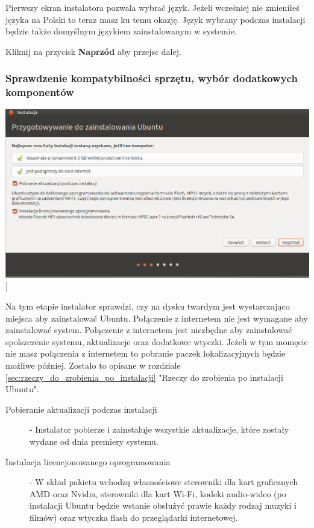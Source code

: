Pierwszy ekran instalatora pozwala wybrać język. Jeżeli wcześniej nie zmieniłeś języka na Polski to teraz masz ku temu okazję. Język wybrany podczas instalacji będzie także domyślnym językiem zainstalowanym w systemie.

\begin{flushright}
Kliknij na przycisk \textbf{Naprzód} aby przejsc dalej.
\end{flushright}
\clearpage

\subsubsection{Sprawdzenie kompatybilności sprzętu, wybór dodatkowych komponentów}
\begin{center}
	\includegraphics[scale=0.5]{images/instalator_wymagania.png}]
\end{center}

Na tym etapie instalator sprawdzi, czy na dysku twardym jest wystarczająco miejsca aby zainstalować Ubuntu. Połączenie z internetem nie jest wymagane aby zainstalować system. Połączenie z internetem jest niezbędne aby zainstalować spolszczenie systemu, aktualizacje oraz dodatkowe wtyczki. Jeżeli w tym momęcie nie masz połączenia z internetem to pobranie paczek lokalizacyjnych będzie możliwe później. Zostało to opisane w rozdziale \ref{sec:rzeczy_do_zrobienia_po_instalacji} "Rzeczy do zrobienia po instalacji Ubuntu".

\begin{description}
\item[Pobieranie aktualizacji podczas instalacji] - Instalator pobierze i zainstaluje wszystkie aktualizacje, które zostały wydane od dnia premiery systemu.
\item[Instalacja licencjonowanego oprogramowania] - W skład pakietu wchodzą własnościowe sterowniki dla kart graficznych AMD oraz Nvidia, sterowniki dla kart Wi-Fi, kodeki audio-wideo (po instalacji Ubuntu będzie wstanie obsłużyć prawie każdy rodzaj muzyki i filmów) oraz wtyczka flash do przeglądarki internetowej.
\end{description}

